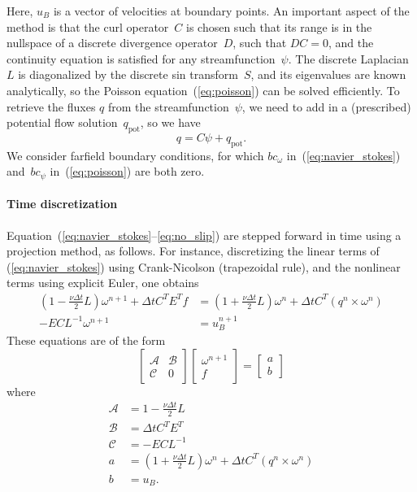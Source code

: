 \documentclass[11pt]{article}
\begin{document}
Here, $u_B$ is a vector of velocities at boundary points.  An important aspect of the method is that the curl operator~$C$ is chosen such that its range is in the nullspace of a discrete divergence operator~$D$, such that $DC=0$, and the continuity equation is satisfied for any streamfunction~$\psi$.  The discrete Laplacian $L$ is diagonalized by the discrete sin transform~$S$, and its eigenvalues are known analytically, so the Poisson equation~(\ref{eq:poisson}) can be solved efficiently.
To retrieve the fluxes $q$ from the streamfunction~$\psi$, we need to add in a (prescribed) potential flow solution~$q_\text{pot}$, so we have
\begin{equation}
	q = C\psi + q_\text{pot}.
\label{eq:compute_q}
\end{equation}
We consider farfield boundary conditions, for which $bc_\omega$ in~(\ref{eq:navier_stokes}) and~$bc_\psi$ in~(\ref{eq:poisson}) are both zero.

\paragraph{Time discretization}
Equation~(\ref{eq:navier_stokes}--\ref{eq:no_slip}) are stepped forward in time using a projection method, as follows.  For instance, discretizing the linear terms of (\ref{eq:navier_stokes}) using Crank-Nicolson (trapezoidal rule), and the nonlinear terms using explicit Euler, one obtains
\begin{align}
	\left(1-\frac{\nu\Delta t}{2}L\right)\omega^{n+1} + \Delta t C^TE^Tf &= \left(1 + \frac{\nu\Delta t}{2}L\right)\omega^n + \Delta t C^T (q^n\times\omega^n)  \label{eq:timestepper}\\
	-ECL^{-1}\omega^{n+1} &= u_B^{n+1}
\end{align}
These equations are of the form
\begin{equation}
	\begin{bmatrix}
		\mathcal{A} & \mathcal{B}\\\mathcal{C} & 0
	\end{bmatrix}
	\begin{bmatrix}
		\omega^{n+1}\\ f
	\end{bmatrix}
	=
	\begin{bmatrix}
		a\\b
	\end{bmatrix}
\label{eq:constrained}
\end{equation}
where
\begin{align}
	\mathcal{A} &= 1 - \frac{\nu\Delta t}{2}L\\
	\mathcal{B} &= \Delta t C^TE^T\\
	\mathcal{C} &= -ECL^{-1}\\
	a &= \left(1+\frac{\nu\Delta t}{2}L\right)\omega^n + \Delta t C^T(q^n\times\omega^n)\\
	b &= u_B.
\end{align}
\end{document}
